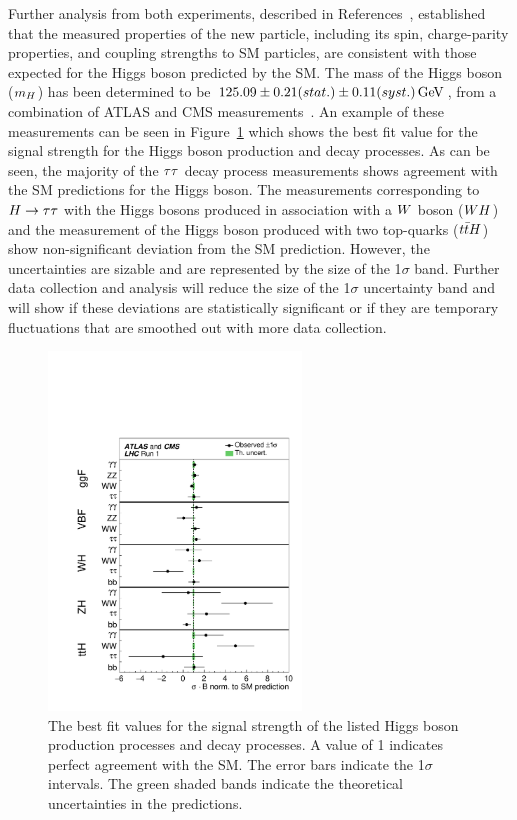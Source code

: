 Further analysis from both experiments, described in References~\cite{Aad:2015gba, Khachatryan:2014jba, 
Chatrchyan:2012jja, Aad:2013xqa, Khachatryan:2014kca,Sirunyan:2017exp},
established that the measured properties of the new particle,
including its spin, charge-parity properties, and coupling strengths to SM particles, 
are consistent with those expected for the Higgs boson predicted by the SM.
The mass of the Higgs boson ($m_{H}$) has been determined to be
$125.09\pm0.21(stat.)\pm0.11(syst.)\,\mathrm{GeV}$, from a combination of
ATLAS and CMS measurements~\cite{Aad:2015zhl}. An example of these measurements
can be seen in Figure~\ref{fig:run_1_comb_mu} which shows the best fit value for the signal
strength for the Higgs boson production and decay processes. As can be seen, the
majority of the $\tau\tau$ decay process measurements shows agreement with the SM predictions for the Higgs
boson. The measurements corresponding to $H\to\tau\tau$ with the Higgs bosons produced in association
with a $W$ boson ($WH$) and the measurement of the Higgs boson produced with
two top-quarks ($t\bar{t}H$) show non-significant deviation from the SM prediction. However, 
the uncertainties are sizable and are represented by the size of the 1$\sigma$ band. Further data collection and analysis
will reduce the size of the 1$\sigma$ uncertainty band and will show if 
these deviations are statistically significant or if they are 
temporary fluctuations that are smoothed out with more data collection.

\begin{figure}[htbp]
\centering
     \includegraphics[width=0.6\textwidth]{introduction/plots/run_1_comb_mu.pdf}
     \caption{
The best fit values for the signal strength of the listed Higgs boson production
processes and decay processes. A value of 1 indicates perfect agreement with the SM.
The error bars indicate the 1$\sigma$ intervals. The green shaded bands indicate the
theoretical uncertainties in the predictions.
     }
     \label{fig:run_1_comb_mu}
\end{figure}

